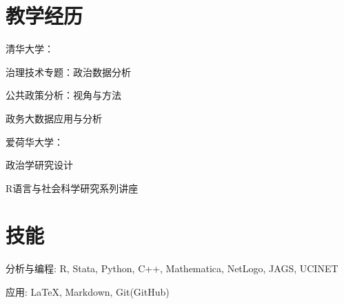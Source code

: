 \documentclass[10.5pt,]{article}
\providecommand{\tightlist}{%
	\setlength{\itemsep}{0pt}\setlength{\parskip}{0pt}}
\renewenvironment{itemize}{
	\begin{list}{}{
			\setlength{\leftmargin}{1.5em}
		}
	}{
	\end{list}
}
\begin{document}
 \hypertarget{ux6559ux5b66ux7ecfux5386}{%
 \section{教学经历}\label{ux6559ux5b66ux7ecfux5386}}

 \begin{itemize}
 \tightlist
 \item
   清华大学：

   \begin{itemize}
   \tightlist
   \item
     治理技术专题：政治数据分析
   \item
     公共政策分析：视角与方法
   \item
     政务大数据应用与分析
   \end{itemize}
 \item
   爱荷华大学：

   \begin{itemize}
   \tightlist
   \item
     政治学研究设计
   \item
     R语言与社会科学研究系列讲座
   \end{itemize}
 \end{itemize}

 \hypertarget{ux6280ux80fd}{%
 \section{技能}\label{ux6280ux80fd}}

 \begin{itemize}
 \tightlist
 \item
   分析与编程: R, Stata, Python, C++, Mathematica, NetLogo, JAGS, UCINET
 \item
   应用: \LaTeX, Markdown, Git(GitHub)
 \end{itemize}
	
			
\end{document}
